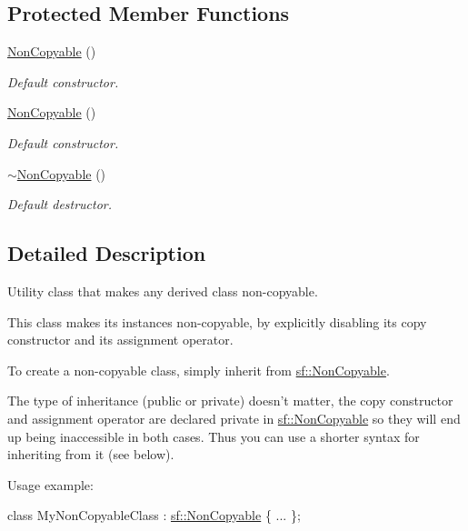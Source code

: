 \subsection*{Protected Member Functions}
\begin{DoxyCompactItemize}
\item 
\hyperlink{classsf_1_1_non_copyable_a2110add170580fdb946f887719da6860}{Non\-Copyable} ()
\begin{DoxyCompactList}\small\item\em Default constructor. \end{DoxyCompactList}\item 
\hyperlink{classsf_1_1_non_copyable_a2110add170580fdb946f887719da6860}{Non\-Copyable} ()
\begin{DoxyCompactList}\small\item\em Default constructor. \end{DoxyCompactList}\item 
\hyperlink{classsf_1_1_non_copyable_a8274ffbf46014f5f7f364befb52c7728}{$\sim$\-Non\-Copyable} ()
\begin{DoxyCompactList}\small\item\em Default destructor. \end{DoxyCompactList}\end{DoxyCompactItemize}


\subsection{Detailed Description}
Utility class that makes any derived class non-\/copyable. 

This class makes its instances non-\/copyable, by explicitly disabling its copy constructor and its assignment operator.

To create a non-\/copyable class, simply inherit from \hyperlink{classsf_1_1_non_copyable}{sf\-::\-Non\-Copyable}.

The type of inheritance (public or private) doesn't matter, the copy constructor and assignment operator are declared private in \hyperlink{classsf_1_1_non_copyable}{sf\-::\-Non\-Copyable} so they will end up being inaccessible in both cases. Thus you can use a shorter syntax for inheriting from it (see below).

Usage example\-: 
\begin{DoxyCode}
\textcolor{keyword}{class }MyNonCopyableClass : \hyperlink{classsf_1_1_non_copyable}{sf::NonCopyable}
\{
    ...
\};
\end{DoxyCode}


